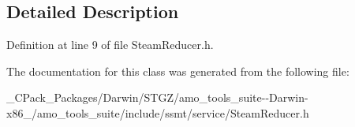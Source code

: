 \subsection{Detailed Description}


Definition at line 9 of file Steam\+Reducer.\+h.



The documentation for this class was generated from the following file\+:\begin{DoxyCompactItemize}
\item 
\+\_\+\+C\+Pack\+\_\+\+Packages/\+Darwin/\+S\+T\+G\+Z/amo\+\_\+tools\+\_\+suite-\/-\/\+Darwin-\/x86\+\_/amo\+\_\+tools\+\_\+suite/include/ssmt/service/Steam\+Reducer.\+h\end{DoxyCompactItemize}
